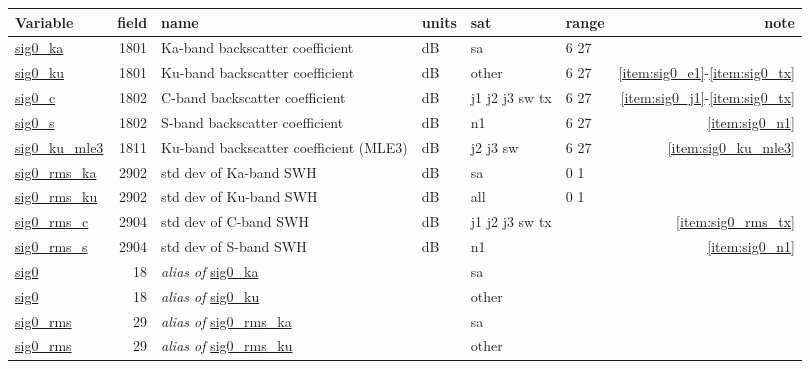 \documentclass[a4paper,11pt,openany,natbib,nomargin]{thesis}
\makeatletter
\newcommand\var[1]{\url{#1}\index{variables!#1@\protect\url{#1}}}
\newcommand\alias[1]{\emph{alias of} \var{#1}}
\newenvironment{vartable}{
\begin{table}[ht]
\small
\begin{tabular}{lrllllr}
\hline
Variable & field & name & units & sat & range & note \\
\hline
}{
\hline
\end{tabular}
\end{table}
}
\makeatother
\begin{document}
\begin{vartable}
\var{sig0_ka} & 1801 & Ka-band backscatter coefficient & dB & sa & 6 27 & \\
\var{sig0_ku} & 1801 & Ku-band backscatter coefficient & dB & other & 6 27 & \ref{item:sig0_e1}-\ref{item:sig0_tx} \\
\var{sig0_c} & 1802 & C-band backscatter coefficient & dB & j1 j2 j3 sw tx & 6 27 & \ref{item:sig0_j1}-\ref{item:sig0_tx} \\
\var{sig0_s} & 1802 & S-band backscatter coefficient & dB & n1 & 6 27 & \ref{item:sig0_n1} \\
\var{sig0_ku_mle3} & 1811 & Ku-band backscatter coefficient (MLE3) & dB & j2 j3 sw & 6 27 & \ref{item:sig0_ku_mle3} \\
\hline
\var{sig0_rms_ka} & 2902 & std dev of Ka-band SWH & dB & sa & 0 1 & \\
\var{sig0_rms_ku} & 2902 & std dev of Ku-band SWH & dB & all & 0 1 & \\
\var{sig0_rms_c} & 2904 & std dev of C-band SWH & dB & j1 j2 j3 sw tx & & \ref{item:sig0_rms_tx} \\
\var{sig0_rms_s} & 2904 & std dev of S-band SWH & dB & n1 & & \ref{item:sig0_n1} \\
\hline
\var{sig0} & 18 & \alias{sig0_ka} && sa && \\
\var{sig0} & 18 & \alias{sig0_ku} && other && \\
\hline
\var{sig0_rms} & 29 & \alias{sig0_rms_ka} && sa && \\
\var{sig0_rms} & 29 & \alias{sig0_rms_ku} && other && \\
\end{vartable}
\end{document}
